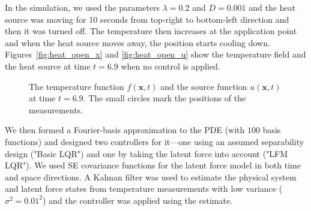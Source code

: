 \documentclass[journal]{IEEEtran}
\begin{document}
In the simulation, we used the parameters $\lambda = 0.2$ and $D = 0.001$ and the heat source was moving for 10 seconds from top-right to bottom-left direction and then it was turned off. The temperature then increases at the application point and when the heat source moves away, the position starts cooling down. Figures~\ref{fig:heat_open_x} and \ref{fig:heat_open_u} show the temperature field and the heat source at time $t = 6.9$ when no control is applied. 

\begin{figure}[!t]
\centering
\caption{The temperature function $f(\mathbf{x},t)$ and the source function $u(\mathbf{x},t)$ at time $t = 6.9$. The small circles mark the positions of the measurements.}
\end{figure}

We then formed a Fourier-basis approximation to the PDE (with $100$ basis functions) and designed two controllers for it---one using an assumed separability design ("Basic LQR") and one by taking the latent force into account ("LFM LQR"). We used SE covariance functions for the latent force model in both time and space directions. A Kalman filter was used to estimate the physical system and latent force states from temperature measurements with low variance ($\sigma^2 = 0.01^2$) and the controller was applied using the estimate.
\end{document}
